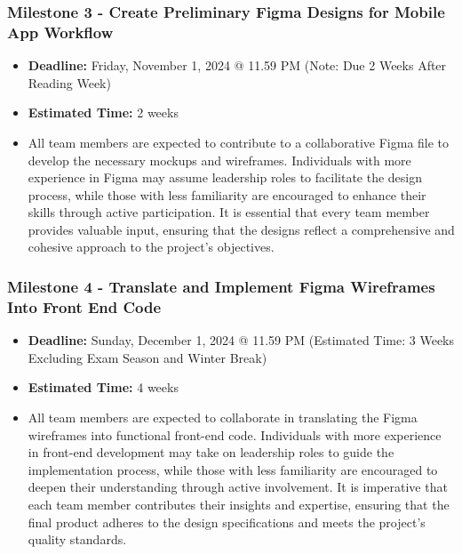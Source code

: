 \documentclass{article}
\begin{document}
\subsubsection*{Milestone 3 - Create Preliminary Figma Designs for Mobile App Workflow}
\begin{itemize}
    \item \textbf{Deadline:} Friday, November 1, 2024 @ 11.59 PM (Note: Due 2 Weeks After Reading Week)
    \item \textbf{Estimated Time:} 2 weeks
    \item All team members are expected to contribute to a collaborative Figma file to develop the necessary mockups and wireframes. Individuals with more experience in Figma may assume leadership roles to facilitate the design process, while those with less familiarity are encouraged to enhance their skills through active participation. It is essential that every team member provides valuable input, ensuring that the designs reflect a comprehensive and cohesive approach to the project’s objectives.
\end{itemize}

\subsubsection*{Milestone 4 - Translate and Implement Figma Wireframes Into Front End Code}
\begin{itemize}
    \item \textbf{Deadline:} Sunday, December 1, 2024 @ 11.59 PM (Estimated Time: 3 Weeks Excluding Exam Season and Winter Break)
    \item \textbf{Estimated Time:} 4 weeks
    \item All team members are expected to collaborate in translating the Figma wireframes into functional front-end code. Individuals with more experience in front-end development may take on leadership roles to guide the implementation process, while those with less familiarity are encouraged to deepen their understanding through active involvement. It is imperative that each team member contributes their insights and expertise, ensuring that the final product adheres to the design specifications and meets the project’s quality standards.
\end{itemize}
\end{document}
